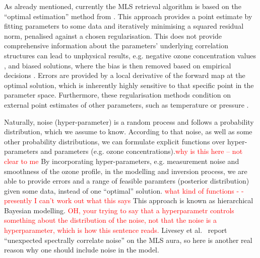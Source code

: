 As already mentioned, currently the MLS retrieval algorithm \cite{livesey2006retrieval} is based on the ``optimal estimation'' method from \cite{rodgers1976retrieval}.
This approach provides a point estimate by fitting parameters to some data and iteratively minimising a squared residual norm, penalised against a chosen regularisation.
This does not provide comprehensive information about the parameters' underlying correlation structures can lead to unphysical results, e.g. negative ozone concentration values \cite{MLSdata}, and biased solutions, where the bias is then removed based on empirical decisions \cite{livesey2008ozonecarbonmono, Froidevaux2008snrozone}.
Errors are provided by a local derivative of the forward map at the optimal solution, which is inherently highly sensitive to that specific point in the parameter space.
Furthermore, these regularisation methods condition on external point estimates of other parameters, such as temperature or pressure \cite{livesey2006retrieval}.



Naturally, noise (hyper-parameter) is a random process and follows a probability distribution, which we assume to know.
According to that noise, as well as some other probability distributions, we can formulate explicit functions over hyper-parameters and parameters (e.g. ozone concentrations).\textcolor{red}{why is this here -- not clear to me}
By incorporating hyper-parameters, e.g. measurement noise and smoothness of the ozone profile, in the modelling and inversion process, we are able to provide errors and a range of feasible paramters (posterior distribution) given some data, instead of one ``optimal'' solution.\textcolor{red}{ what kind of functions - -presently I can't work out what this says}
This approach is known as hierarchical Bayesian modelling.\textcolor{red}{  OH, your trying to say that a hyperparametr controls something about the distribution of the noise, not that the noise is a hyperparameter, which is how this sentence reads.}
Livesey et al.~\cite{livesey2006retrieval} report ``unexpected spectrally correlate noise'' on the MLS aura, so here is another real reason why one should include noise in the model.

